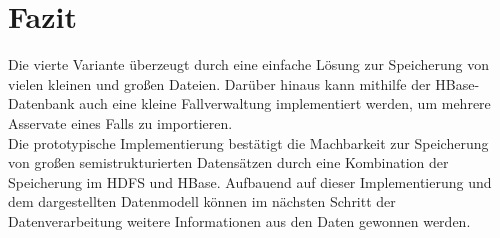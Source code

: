 \section{Fazit} 
Die vierte Variante überzeugt durch eine einfache Lösung zur Speicherung von vielen kleinen und großen Dateien. Darüber hinaus kann mithilfe der HBase-Datenbank auch eine kleine Fallverwaltung implementiert werden, um mehrere Asservate eines Falls zu importieren.\\ Die prototypische Implementierung bestätigt die Machbarkeit zur Speicherung von großen semistrukturierten Datensätzen durch eine Kombination der Speicherung im HDFS und HBase. Aufbauend auf dieser Implementierung und dem dargestellten Datenmodell können im nächsten Schritt der Datenverarbeitung weitere Informationen aus den Daten gewonnen werden. 